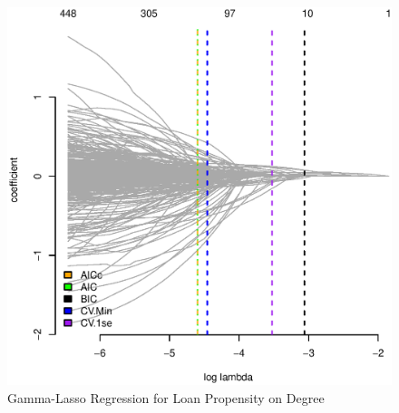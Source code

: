 \documentclass[11pt, fleqn]{article}
\begin{document}


\begin{figure}[!htb]
  \centering
  \includegraphics[scale=.5]{treat_aic.eps}
  \caption{Gamma-Lasso Regression for Loan Propensity on Degree}
  \label{fig:causal_aic}
\end{figure}


\end{document}

